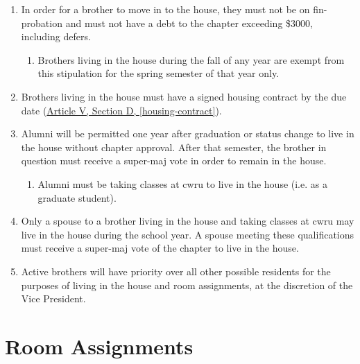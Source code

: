 \begin{enumerate}
		\item In order for a brother to move in to the house, they must not be on \gls{fin-probation} and must not have a debt to the chapter exceeding \$3000, including \glspl{defer}.
        \begin{enumerate}
            \item Brothers living in the house during the fall of any year are exempt from this stipulation for the spring semester of that year only.
        \end{enumerate}

		\item Brothers living in the house must have a signed housing contract by the due date (\hyperref[housing-contract]{Article V, Section D, \autoref*{housing-contract}}). 

		\item Alumni will be permitted one year after graduation or status change to live in the house without chapter approval. After that semester, the brother in question must receive a \gls{super-maj} vote in order to remain in the house. %
			\begin{enumerate}
				\item Alumni must be taking classes at \gls{cwru} to live in the house (i.e. as a graduate student).
			\end{enumerate}

		\item Only a spouse to a brother living in the house and taking classes at \gls{cwru} may live in the house during the school year. A spouse meeting these qualifications must receive a \gls{super-maj} vote of the chapter to live in the house.

		\item Active brothers will have priority over all other possible residents for the purposes of living in the house and room assignments, at the discretion of the Vice President.
	\end{enumerate}

\section{Room Assignments}
\label{housing}

